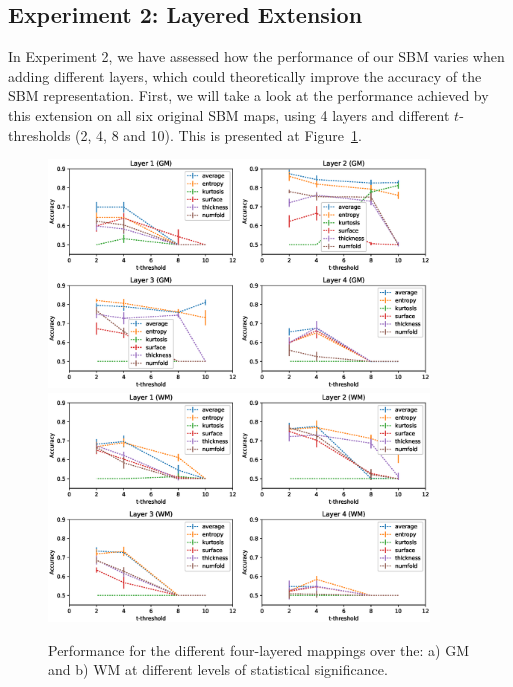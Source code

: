 \subsection{Experiment 2: Layered Extension}\label{sec:layeredttest}
In Experiment 2, we have assessed how the performance of our \ac{SBM} varies when adding different layers, which could theoretically improve the accuracy of the \ac{SBM} representation. First, we will take a look at the performance achieved by this extension on all six original \ac{SBM} maps, using 4 layers and different $t$-thresholds (2, 4, 8 and 10). This is presented at Figure~\ref{fig:layeredPerf}. 

\begin{figure}[htp]
	\centering
	\includegraphics[width=0.9\textwidth]{Graphics/ch6/layerPerfGM}\\
	\includegraphics[width=0.9\textwidth]{Graphics/ch6/layerPerfWM}
	
	\caption[Performance of the four-layered mappings.]{Performance for the different four-layered mappings over the: a) \acs{GM} and b) \acs{WM} at different levels of statistical significance.}
	\label{fig:layeredPerf}
\end{figure}

